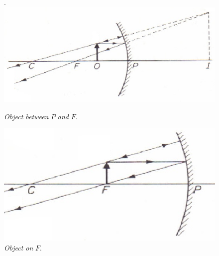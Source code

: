 \documentclass{scrartcl}
\begin{document}
    \begin{figure}[H]
        \centering
        \begin{minipage}[b]{0.49\textwidth}.
        \includegraphics[width=\textwidth]{concave1.eps}
        \caption{\textit{Object between} $P$ \textit{and} $F$.}
        \end{minipage}
        \hfill
        \begin{minipage}[b]{0.49\textwidth}
            \includegraphics[width=\textwidth]{concave2.eps}
            \caption{\textit{Object on} $F$.}
        \end{minipage}
    \end{figure}
\end{document}
